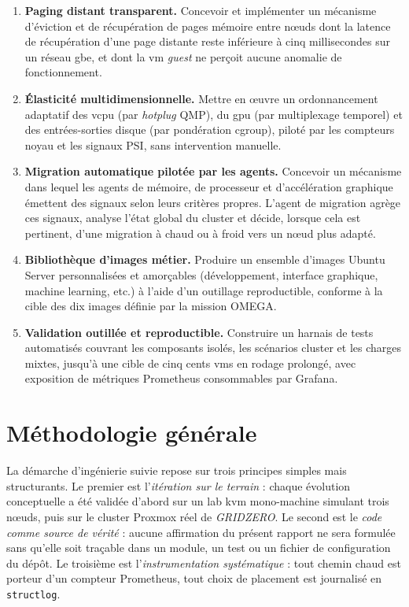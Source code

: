 \begin{enumerate}[leftmargin=*, label=\textbf{O\arabic*.}]
    \item \textbf{Paging distant transparent.} Concevoir et implémenter un mécanisme d'éviction et de récupération de pages mémoire entre nœuds dont la latence de récupération d'une page distante reste inférieure à cinq millisecondes sur un réseau \acrshort{gbe}, et dont la \acrshort{vm} \emph{guest} ne perçoit aucune anomalie de fonctionnement.
    \item \textbf{Élasticité multidimensionnelle.} Mettre en œuvre un ordonnancement adaptatif des \acrshort{vcpu} (par \emph{hotplug} QMP), du \acrshort{gpu} (par multiplexage temporel) et des entrées-sorties disque (par pondération cgroup), piloté par les compteurs noyau et les signaux PSI, sans intervention manuelle.
    \item \textbf{Migration automatique pilotée par les agents.} Concevoir un mécanisme dans lequel les agents de mémoire, de processeur et d'accélération graphique émettent des signaux selon leurs critères propres. L'agent de migration agrège ces signaux, analyse l'état global du cluster et décide, lorsque cela est pertinent, d'une migration à chaud ou à froid vers un nœud plus adapté.
    \item \textbf{Bibliothèque d'images métier.} Produire un ensemble d'images Ubuntu Server personnalisées et amorçables (développement, interface graphique, machine learning, etc.) à l'aide d'un outillage reproductible, conforme à la cible des dix images définie par la mission OMEGA.
    \item \textbf{Validation outillée et reproductible.} Construire un harnais de tests automatisés couvrant les composants isolés, les scénarios cluster et les charges mixtes, jusqu'à une cible de cinq cents \acrshort{vm}s en rodage prolongé, avec exposition de métriques Prometheus consommables par Grafana.
\end{enumerate}

\section*{Méthodologie générale}

La démarche d'ingénierie suivie repose sur trois principes simples mais structurants. Le premier est l'\emph{itération sur le terrain} : chaque évolution conceptuelle a été validée d'abord sur un lab \acrshort{kvm} mono-machine simulant trois nœuds, puis sur le cluster Proxmox réel de \emph{GRIDZERO}. Le second est le \emph{code comme source de vérité} : aucune affirmation du présent rapport ne sera formulée sans qu'elle soit traçable dans un module, un test ou un fichier de configuration du dépôt. Le troisième est l'\emph{instrumentation systématique} : tout chemin chaud est porteur d'un compteur Prometheus, tout choix de placement est journalisé en \texttt{structlog}.

